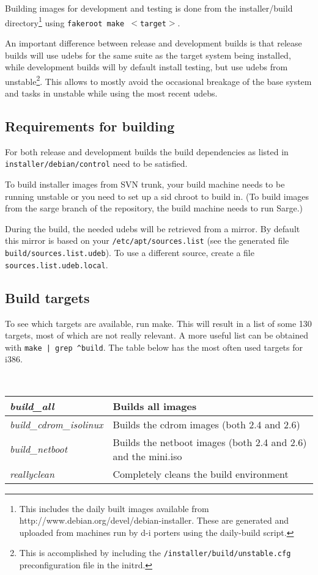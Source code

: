 \documentclass[a4paper,10pt]{article}
\begin{document}
Building images for development and testing is done from the installer/build directory\footnote{This includes the daily built images available from http://www.debian.org/devel/debian-installer. These are generated and uploaded from machines run by d-i porters using the daily-build script.} using \texttt{fakeroot make $<$target$>$}. 

An important difference between release and development builds is that release builds will use udebs for the same suite as the target system being installed, while development builds will by default install testing, but use udebs from unstable\footnote{This is accomplished by including the \texttt{/installer/build/unstable.cfg} preconfiguration file in the initrd.}. This allows to mostly avoid the occasional breakage of the base system and tasks in unstable while using the most recent udebs. 


\subsection{Requirements for building}
For both release and development builds the build dependencies as listed in \texttt{installer/debian/control} need to be satisfied. 

To build installer images from SVN trunk, your build machine needs to be running unstable or you need to set up a sid chroot to build in. (To build images from the sarge branch of the repository, the build machine needs to run Sarge.)

During the build, the needed udebs will be retrieved from a mirror. By default this mirror is based on your \texttt{/etc/apt/sources.list} (see the generated file \texttt{build/sources.list.udeb}). To use a different source, create a file \texttt{sources.list.udeb.local}.


\subsection{Build targets}
To see which targets are available, run make. This will result in a list of some 130 targets, most of which are not really relevant. A more useful list can be obtained with \texttt{make | grep \^{ }build}. The table below has the most often used targets for i386.

\

\begin{tabular}{|l|l|}
\hline
\textit{build\_all} & Builds all images \\
\hline
\textit{build\_cdrom\_isolinux} & Builds the cdrom images (both 2.4 and 2.6) \\
\hline
\textit{build\_netboot} & Builds the netboot images (both 2.4 and 2.6) and the mini.iso \\
\hline
\textit{reallyclean} & Completely cleans the build environment \\
\hline
\end{tabular} 
\end{document}
